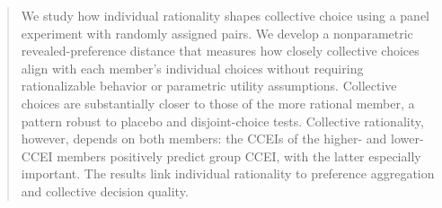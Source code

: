 \documentclass[11 pt]{article}
\begin{document}
\begin{abstract}

We study how individual rationality shapes collective choice using a panel experiment with randomly assigned pairs. We develop a nonparametric revealed-preference distance that measures how closely collective choices align with each member’s individual choices without requiring rationalizable behavior or parametric utility assumptions. Collective choices are substantially closer to those of the more rational member, a pattern robust to placebo and disjoint-choice tests. Collective rationality, however, depends on both members: the CCEIs of the higher- and lower-CCEI members positively predict group CCEI, with the latter especially important. The results link individual rationality to preference aggregation and collective decision quality.


\end{abstract}
\end{document}
